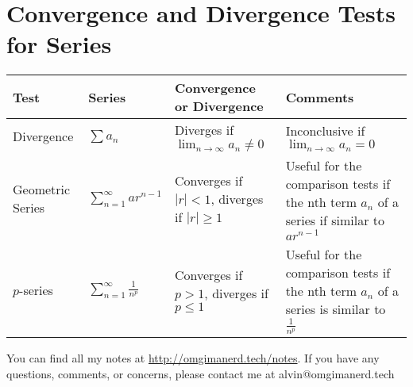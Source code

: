 \documentclass{math}
\begin{document}
\section*{Convergence and Divergence Tests for Series}
\bgroup
  \def\arraystretch{2}
  \begin{tabular}{| m{2cm} | m{2cm} | m{5cm} | m{6cm} |}
    \hline
    Test & Series & Convergence or Divergence & Comments \\
    \hline
      Divergence &
      \( \sum{a_{n}} \) &
      Diverges if \( \lim_{n\to\infty}{a_{n}} \neq 0 \) &
      Inconclusive if \( \lim_{n\to\infty}{a_{n}} = 0 \) \\
    \hline
      Geometric Series &
      \( \sum_{n=1}^{\infty}{ar^{n-1}} \) &
      Converges if \( |r| < 1 \), diverges if \( |r| \geq 1 \) &
      Useful for the comparison tests if the nth term \( a_{n} \) of a series
        if similar to \( ar^{n-1} \) \\
    \hline
      \( p \)-series &
      \( \sum_{n=1}^{\infty}\frac{1}{n^{p}} \) &
      Converges if \( p > 1 \), diverges if \( p \leq 1 \) &
      Useful for the comparison tests if the nth term \( a_{n} \) of a series
      is similar to \( \frac{1}{n^{p}} \) \\
    \hline
  \end{tabular}
\egroup

\begin{center}
  You can find all my notes at \url{http://omgimanerd.tech/notes}. If you have
  any questions, comments, or concerns, please contact me at
  alvin@omgimanerd.tech
\end{center}
\end{document}
